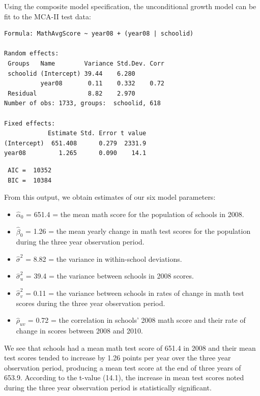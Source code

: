 \documentclass[
]{krantz}
\providecommand{\tightlist}{%
  \setlength{\itemsep}{0pt}\setlength{\parskip}{0pt}}
\begin{document}
Using the composite model specification, the unconditional growth model can be fit to the MCA-II test data:

\begin{verbatim}
Formula: MathAvgScore ~ year08 + (year08 | schoolid)

Random effects:
 Groups   Name        Variance Std.Dev. Corr
 schoolid (Intercept) 39.44    6.280        
          year08       0.11    0.332    0.72
 Residual              8.82    2.970        
Number of obs: 1733, groups:  schoolid, 618

Fixed effects:
            Estimate Std. Error t value
(Intercept)  651.408      0.279  2331.9
year08         1.265      0.090    14.1
\end{verbatim}

\begin{verbatim}
 AIC =  10352 
 BIC =  10384
\end{verbatim}

From this output, we obtain estimates of our six model parameters:

\begin{itemize}
\tightlist
\item
  \(\hat{\alpha}_{0}\) = 651.4 = the mean math score for the population of schools in 2008.
\item
  \(\hat{\beta}_{0}\) = 1.26 = the mean yearly change in math test scores for the population during the three year observation period.
\item
  \(\hat{\sigma}^2\) = 8.82 = the variance in within-school deviations.
\item
  \(\hat{\sigma}^2_u\) = 39.4 = the variance between schools in 2008 scores.
\item
  \(\hat{\sigma}^2_v\) = 0.11 = the variance between schools in rates of change in math test scores during the three year observation period.
\item
  \(\hat{\rho}_{uv}\) = 0.72 = the correlation in schools' 2008 math score and their rate of change in scores between 2008 and 2010.
\end{itemize}

We see that schools had a mean math test score of 651.4 in 2008 and their mean test scores tended to increase by 1.26 points per year over the three year observation period, producing a mean test score at the end of three years of 653.9. According to the t-value (14.1), the increase in mean test scores noted during the three year observation period is statistically significant.
\end{document}
